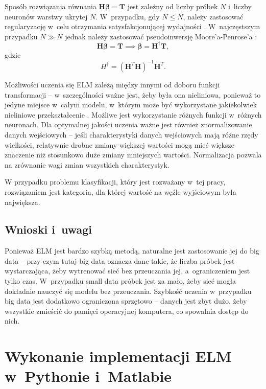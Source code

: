 \documentclass{article}
\begin{document}
Sposób rozwiązania równania $\bm{H}\bm{\beta}=\bm{T}$ jest zależny od liczby próbek $N$ i~liczby neuronów warstwy ukrytej $\bar{N}$. W~przypadku, gdy $N \leq \bar{N}$, należy zastosować regularyzację w~celu otrzymania satysfakcjonującej wydajności \cite{akusok-hpelm}. W~najczęstszym przypadku $N \gg \bar{N}$ jednak należy zastosować pseudoinwersję Moore'a-Penrose'a \cite{huang-elm-base:ta}:
\begin{equation}
\bm{H}\bm{\beta}=\bm{T} \implies \bm{\beta}=\bm{H}^{\dagger}\bm{T},
\end{equation}
gdzie 
\begin{equation}
{H}^{\dagger} = (\bm{H}^T \bm{H})^{-1}\bm{H}^T.
\end{equation}

Możliwości uczenia się ELM zależą między innymi od doboru funkcji transformacji -- w~szczególności ważne jest, żeby była ona nieliniowa, ponieważ to jedyne miejsce w~całym modelu, w~którym może być wykorzystane jakiekolwiek nieliniowe przekształcenie \cite{akusok-hpelm}. Możliwe jest wykorzystanie różnych funkcji w~różnych neuronach. Dla optymalnej jakości uczenia ważne jest również znormalizowanie danych wejściowych -- jeśli charakterystyki danych wejściowych mają różne rzędy wielkości, relatywnie drobne zmiany większej wartości mogą mieć większe znaczenie niż stosunkowo duże zmiany mniejszych wartości. Normalizacja pozwala na zrównanie wagi zmian wszystkich charakterystyk. \par

W przypadku problemu klasyfikacji, który jest rozważany w~tej pracy, rozwiązaniem jest kategoria, dla której wartość na węźle wyjściowym była największa. 
\subsection{Wnioski i~uwagi}
Ponieważ ELM jest bardzo szybką metodą, naturalne jest zastosowanie jej do big data -- przy czym tutaj big data oznacza dane takie, że liczba próbek jest wystarczająca, żeby wytrenować sieć bez przeuczania jej, a~ograniczeniem jest tylko czas. W~przypadku small data próbek jest za mało, żeby sieć mogła dokładnie nauczyć się modelu bez przeuczania. Szybkość uczenia w~przypadku big data jest dodatkowo ograniczona sprzętowo -- danych jest zbyt dużo, żeby wszystkie zmieścić do pamięci operacyjnej komputera, co spowalnia dostęp do nich.

\clearpage
\section{Wykonanie implementacji ELM w~Pythonie i~Matlabie}
\end{document}

